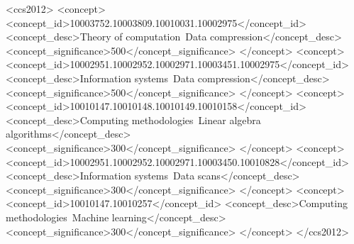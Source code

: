 





     



\begin{CCSXML}
<ccs2012>
<concept>
<concept_id>10003752.10003809.10010031.10002975</concept_id>
<concept_desc>Theory of computation~Data compression</concept_desc>
<concept_significance>500</concept_significance>
</concept>
<concept>
<concept_id>10002951.10002952.10002971.10003451.10002975</concept_id>
<concept_desc>Information systems~Data compression</concept_desc>
<concept_significance>500</concept_significance>
</concept>
<concept>
<concept_id>10010147.10010148.10010149.10010158</concept_id>
<concept_desc>Computing methodologies~Linear algebra algorithms</concept_desc>
<concept_significance>300</concept_significance>
</concept>
<concept>
<concept_id>10002951.10002952.10002971.10003450.10010828</concept_id>
<concept_desc>Information systems~Data scans</concept_desc>
<concept_significance>300</concept_significance>
</concept>
<concept>
<concept_id>10010147.10010257</concept_id>
<concept_desc>Computing methodologies~Machine learning</concept_desc>
<concept_significance>300</concept_significance>
</concept>
</ccs2012>
\end{CCSXML}

